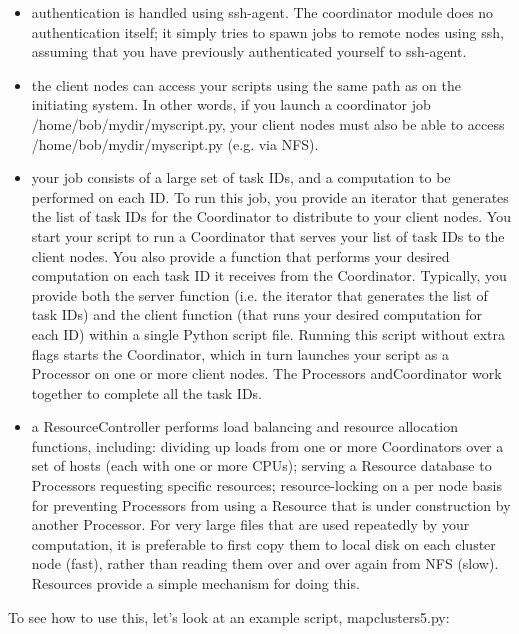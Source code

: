 \documentclass{howto}
\begin{document}
\begin{itemize}

\item
authentication is handled using ssh-agent.  The coordinator module does no authentication itself; it simply tries to spawn jobs to remote nodes using ssh, assuming that you have previously authenticated yourself to ssh-agent. 

\item
the client nodes can access your scripts using the same path as on the initiating system.  In other words, if you launch a coordinator job /home/bob/mydir/myscript.py, your client nodes must also be able to access /home/bob/mydir/myscript.py (e.g. via NFS).

\item
your job consists of a large set of task IDs, and a computation to be performed on each ID.  To run this job, you provide an iterator that generates the list of task IDs for the Coordinator to distribute to your client nodes.  You start your script to run a Coordinator that serves your list of task IDs to the client nodes.  You also provide  a function that performs your desired computation on each task ID it receives from the Coordinator.  Typically, you provide both the server function (i.e. the iterator that generates the list of task IDs) and the client function (that runs your desired computation for each ID) within a single Python script file.  Running this script without extra flags starts the Coordinator, which in turn launches your script as a Processor on one or more client nodes.  The Processors andCoordinator work together to complete all the task IDs.

\item
a ResourceController performs load balancing and resource allocation functions, including: dividing up loads from one or more Coordinators over a set of hosts (each with one or more CPUs); serving a Resource database to Processors requesting specific resources; resource-locking on a per node basis for preventing Processors from using a Resource that is under construction by another Processor.  For very large files that are used repeatedly by your computation, it is preferable to first copy them to local disk on each cluster node (fast), rather than reading them over and over again from NFS (slow).  Resources provide a simple mechanism for doing this.

\end{itemize}
To see how to use this, let's look at an example script, mapclusters5.py:
\end{document}

